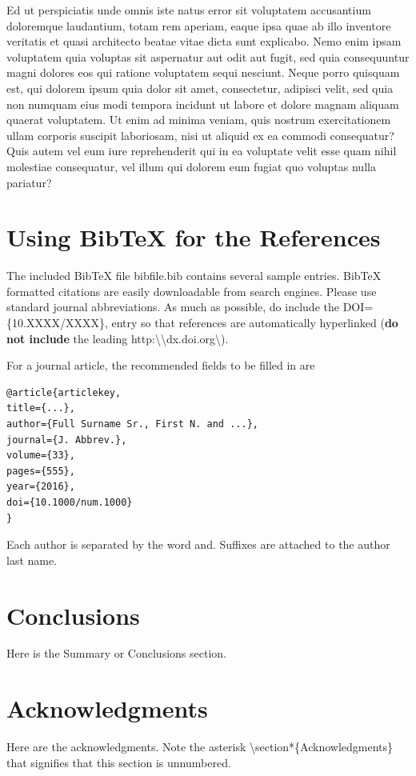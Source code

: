 \documentclass{article}
\begin{document}
Ed ut perspiciatis unde omnis iste natus error sit voluptatem accusantium doloremque laudantium, totam rem aperiam, eaque ipsa quae ab illo inventore veritatis et quasi architecto beatae vitae dicta sunt explicabo. Nemo enim ipsam voluptatem quia voluptas sit aspernatur aut odit aut fugit, sed quia consequuntur magni dolores eos qui ratione voluptatem sequi nesciunt. Neque porro quisquam est, qui dolorem ipsum quia dolor sit amet, consectetur, adipisci velit, sed quia non numquam eius modi tempora incidunt ut labore et dolore magnam aliquam quaerat voluptatem. Ut enim ad minima veniam, quis nostrum exercitationem ullam corporis suscipit laboriosam, nisi ut aliquid ex ea commodi consequatur? Quis autem vel eum iure reprehenderit qui in ea voluptate velit esse quam nihil molestiae consequatur, vel illum qui dolorem eum fugiat quo voluptas nulla pariatur?

\section{Using BibTeX for the References}
The included BibTeX file {\ttfamily bibfile}.{\ttfamily bib} contains several sample entries. BibTeX formatted citations are easily downloadable from search engines. Please use standard journal abbreviations. As much as possible, do include the {\ttfamily DOI}=\{{\ttfamily 10.XXXX}/{\ttfamily XXXX}\}{\ttfamily ,} entry so that references are automatically hyperlinked (\textbf{do not include} the leading {\ttfamily http}:\textbackslash\textbackslash{\ttfamily dx.doi.org}\textbackslash).

For a journal article, the recommended fields to be filled in are
\begin{verbatim}
@article{articlekey,
title={...},
author={Full Surname Sr., First N. and ...},
journal={J. Abbrev.},
volume={33},
pages={555},
year={2016},
doi={10.1000/num.1000}
}
\end{verbatim}
Each author is separated by the word {\ttfamily and}. Suffixes are attached to the author last name.

\section{Conclusions}
Here is the Summary or Conclusions section.

\section*{Acknowledgments}
Here are the acknowledgments. Note the asterisk \textbackslash{\ttfamily section*}\{{\ttfamily Acknowledgments}\} that signifies that this section is unnumbered.

\end{document}
